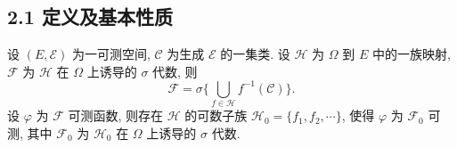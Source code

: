     \subsection{2.1 定义及基本性质}
        \begin{1}
            设 $(E,\mathcal{E})$ 为一可测空间, 
            $\mathcal{C}$ 为生成 $\mathcal{E}$ 的一集类. 
            设 $\mathcal{H}$ 为 $\Omega$ 到 $E$ 中的一族映射, 
            $\mathcal{F}$ 为 $\mathcal{H}$ 在 $\Omega$ 上诱导的 $\sigma$ 代数, 则
            \[
                \mathcal{F}=\sigma\{\bigcup_{f\in\mathcal{H}}f^{-1}(\mathcal{C})\}.
            \]
            设 $\varphi$ 为 $\mathcal{F}$ 可测函数, 则存在 $\mathcal{H}$ 的可数子族 $\mathcal{H}_0=\{ f_1,f_2,\cdots\}$, 
            使得 $\varphi$ 为 $\mathcal{F}_0$ 可测, 
            其中 $\mathcal{F}_0$ 为 $\mathcal{H}_0$ 在 $\Omega$ 上诱导的 $\sigma$ 代数.
        \end{1}
